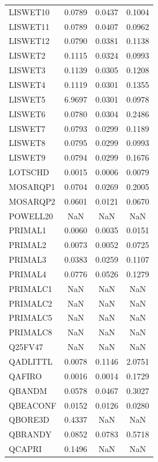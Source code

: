 \begin{longtable}{lccc}
LISWET10 &   0.0789 &   0.0437 &   0.1004 \\
LISWET11 &   0.0789 &   0.0407 &   0.0962 \\
LISWET12 &   0.0790 &   0.0381 &   0.1138 \\
LISWET2  &   0.1115 &   0.0324 &   0.0993 \\
LISWET3  &   0.1139 &   0.0305 &   0.1208 \\
LISWET4  &   0.1119 &   0.0301 &   0.1355 \\
LISWET5  &   6.9697 &   0.0301 &   0.0978 \\
LISWET6  &   0.0780 &   0.0304 &   0.2486 \\
LISWET7  &   0.0793 &   0.0299 &   0.1189 \\
LISWET8  &   0.0795 &   0.0299 &   0.0993 \\
LISWET9  &   0.0794 &   0.0299 &   0.1676 \\
LOTSCHD  &   0.0015 &   0.0006 &   0.0079 \\
MOSARQP1 &   0.0704 &   0.0269 &   0.2005 \\
MOSARQP2 &   0.0601 &   0.0121 &   0.0670 \\
POWELL20 &      NaN &      NaN &      NaN \\
PRIMAL1  &   0.0060 &   0.0035 &   0.0151 \\
PRIMAL2  &   0.0073 &   0.0052 &   0.0725 \\
PRIMAL3  &   0.0383 &   0.0259 &   0.1107 \\
PRIMAL4  &   0.0776 &   0.0526 &   0.1279 \\
PRIMALC1 &      NaN &      NaN &      NaN \\
PRIMALC2 &      NaN &      NaN &      NaN \\
PRIMALC5 &      NaN &      NaN &      NaN \\
PRIMALC8 &      NaN &      NaN &      NaN \\
Q25FV47  &      NaN &      NaN &      NaN \\
QADLITTL &   0.0078 &   0.1146 &   2.0751 \\
QAFIRO   &   0.0016 &   0.0014 &   0.1729 \\
QBANDM   &   0.0578 &   0.0467 &   0.3027 \\
QBEACONF &   0.0152 &   0.0126 &   0.0280 \\
QBORE3D  &   0.4337 &      NaN &      NaN \\
QBRANDY  &   0.0852 &   0.0783 &   0.5718 \\
QCAPRI   &   0.1496 &      NaN &      NaN \\

\end{longtable}
